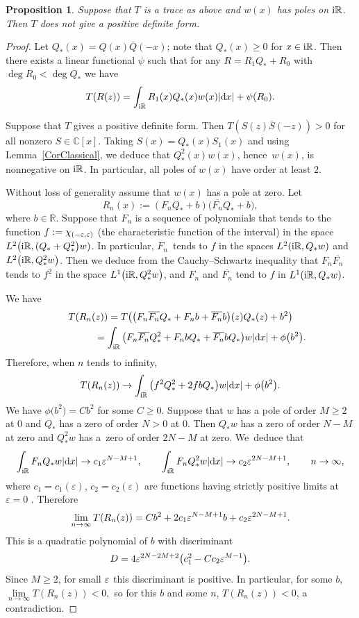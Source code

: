 \documentclass[pdftex]{sigma}
\newcommand{\RN}{\mathbb{R}} %
\newcommand{\CN}{\mathbb{C}} %
\newcommand{\eps}{\ensuremath\varepsilon}
\newcommand{\ovl}{\overline}
\newtheorem{Proposition}[Theorem]{Proposition}
\theoremstyle{definition}
\numberwithin{equation}{section}
\begin{document}
\begin{Proposition}
\label{PropPositiveFormNoPoles}
Suppose that $T$ is a trace as above and $w(x)$ has poles on ${\rm i}\RN$. Then $T$ does not give a positive definite form.
\end{Proposition}
\begin{proof}
Let $Q_*(x)=Q(x)\ovl{Q}(-x)$; note that $Q_*(x)\ge 0$ for $x\in {\rm i}\mathbb R$. Then there exists a linear functional $\psi$ such that for any $R=R_1Q_*+R_0$ with $\deg R_0<\deg Q_*$ we have
\[
T(R(z))=\int_{{\rm i}\RN}R_1(x)Q_*(x)w(x)|{\rm d}x|+\psi(R_0).
\]

Suppose that $T$ gives a positive definite form. Then $T(S(z)\ovl{S}(-z))>0$ for all nonzero \mbox{$S\in\CN[x]$}. Taking $S(x)=Q_*(x)S_1(x)$ and using Lemma~\ref{CorClassical}, we deduce that $Q_*^2(x)w(x)$, hence~$w(x)$, is nonnegative on ${\rm i}\RN$. In particular, all poles of $w(x)$ have order at least $2$.

Without loss of generality assume that $w(x)$ has a pole at zero. Let
\[
R_n(x):=(F_nQ_*+b)\big(\ovl{F_n}Q_*+b\big),
\]
where $b\in \RN$. Suppose that $F_n$ is a sequence of polynomials that tends to the function $f:=\chi_{(-\eps,\eps)}$ (the characteristic function of the interval) in the space $L^{2}\big({\rm i}\RN, (Q_*+Q_*^2\big)w)$. In particular, $F_n$~tends to $f$ in the spaces $L^2({\rm i}\RN,Q_* w)$ and $L^2\big({\rm i}\RN,Q_*^2 w\big)$. Then we deduce from the Cauchy--Schwartz inequality that $F_n\ovl{F_n}$ tends to $f^2$ in the space $L^1\big({\rm i}\RN,Q_*^2w\big)$, and $F_n$ and $\ovl{F_n}$ tend to $f$ in $L^1({\rm i}\RN,Q_*w)$.

We have
\begin{gather*}
T(R_n(z))=T\big(\big(F_n\ovl{F_n}Q_*+F_nb+\ovl{F_n}b\big)(z)Q_*(z)+b^2\big)
\\ \hphantom{T(R_n(z))}
{}=\int_{{\rm i}\RN}\big(F_n\ovl{F_n}Q_*^2+F_nbQ_*+\ovl{F_n}bQ_*\big)w|{\rm d}x|+\phi\big(b^2\big).
\end{gather*}
Therefore, when $n$ tends to infinity,
\[
T(R_n(z))\to \int_{{\rm i}\RN}\big(f^2Q_*^2+2fbQ_*\big)w|{\rm d}x|+\phi\big(b^2\big).
\]
We have $\phi\big(b^2\big)=Cb^2$ for some $C\geq 0$. Suppose that $w$ has a pole of order $M\geq 2$ at $0$ and $Q_*$ has a zero of order $N>0$ at $0$. Then $Q_*w$ has a zero of order $N-M$ at zero and $Q_*^2w$ has a~zero of order $2N-M$ at zero. We~deduce that
\[
\int_{{\rm i}\RN}F_nQ_*w|{\rm d}x|\to c_1\eps^{N-M+1},\qquad \int_{{\rm i}\RN}F_nQ_*^2w|{\rm d}x|\to c_2\eps^{2N-M+1},\qquad n\to \infty,
\]
 where $c_1=c_1(\varepsilon)$, $c_2=c_2(\varepsilon)$ are functions having strictly positive limits at $\varepsilon=0$ . Therefore
 \[
 \lim_{n\to\infty}T(R_n(z))=Cb^2+2c_1\eps^{N-M+1}b+c_2\eps^{2N-M+1}.
 \]
 This is a quadratic polynomial of $b$ with discriminant
 \[
 D=4\eps^{2N-2M+2}\big(c_1^2-Cc_2\eps^{M-1}\big).
 \]
 Since $M{\geq }2$, for small $\eps$ this discriminant is positive. In particular, for some $b$,
 $ \lim\limits_{n\to\infty}T(R_n(z)){<}0,$
 so for this $b$ and some $n$, $T(R_n(z))<0$, a contradiction.
\end{proof}
\end{document}
